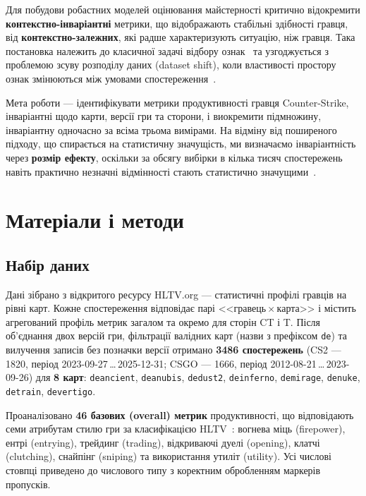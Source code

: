 Для побудови робастних моделей оцінювання майстерності критично відокремити
\textbf{контекстно-інваріантні} метрики, що відображають стабільні здібності гравця, від
\textbf{контекстно-залежних}, які радше характеризують ситуацію, ніж гравця. Така постановка
належить до класичної задачі відбору ознак~\cite{Guyon} та узгоджується з проблемою зсуву
розподілу даних (dataset shift), коли властивості простору ознак змінюються між умовами
спостереження~\cite{Quinonero}.

Мета роботи --- ідентифікувати метрики продуктивності гравця Counter-Strike, інваріантні щодо
карти, версії гри та сторони, і виокремити підмножину, інваріантну одночасно за всіма трьома
вимірами. На відміну від поширеного підходу, що спирається на статистичну значущість, ми
визначаємо інваріантність через \textbf{розмір ефекту}, оскільки за обсягу вибірки в кілька тисяч
спостережень навіть практично незначні відмінності стають статистично
значущими~\cite{Cohen,Sullivan}.

\section{Матеріали і методи}

\subsection{Набір даних}

Дані зібрано з відкритого ресурсу HLTV.org --- статистичні профілі гравців на рівні карт. Кожне
спостереження відповідає парі <<гравець\,$\times$\,карта>> і містить агрегований профіль метрик
загалом та окремо для сторін CT і T. Після об'єднання двох версій гри, фільтрації валідних карт
(назви з префіксом \texttt{de\us{}}) та вилучення записів без позначки версії отримано
\textbf{3486 спостережень} (CS2 --- 1820, період 2023-09-27\,\ldots\,2025-12-31; CSGO --- 1666,
період 2012-08-21\,\ldots\,2023-09-26) для \textbf{8 карт}: \texttt{de\us{}ancient},
\texttt{de\us{}anubis}, \texttt{de\us{}dust2}, \texttt{de\us{}inferno}, \texttt{de\us{}mirage},
\texttt{de\us{}nuke}, \texttt{de\us{}train}, \texttt{de\us{}vertigo}.

Проаналізовано \textbf{46 базових (overall) метрик} продуктивності, що відповідають семи
атрибутам стилю гри за класифікацією HLTV~\cite{HLTV}: вогнева міць (firepower), ентрі
(entrying), трейдинг (trading), відкриваючі дуелі (opening), клатчі (clutching), снайпінг
(sniping) та використання утиліт (utility). Усі числові стовпці приведено до числового типу з
коректним обробленням маркерів пропусків.

